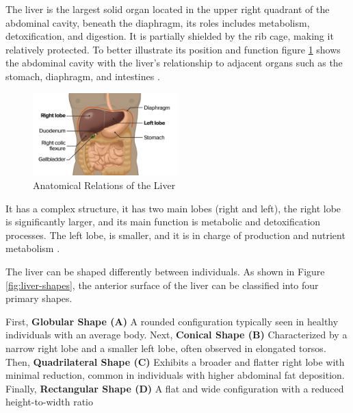 The liver is the largest solid organ located in the upper right quadrant of the abdominal cavity, beneath the diaphragm, its roles includes metabolism, detoxification, and digestion. It is partially shielded by the rib cage, making it relatively protected. To better illustrate its position and function figure \ref{fig:liver-relations} shows the abdominal cavity with the liver’s relationship to adjacent organs such as the stomach, diaphragm, and intestines \cite{lecturio2023,ozmen2020}. 

\begin{figure}[H] %
	\centering
	\includegraphics[width=0.5\textwidth]{assets/Liver-relations.png} %
	\caption{Anatomical Relations of the Liver}
	\label{fig:liver-relations}
\end{figure}

It has a complex structure, it has two main lobes (right and left), the right lobe is significantly larger, and its main function is metabolic and detoxification processes. The left lobe, is smaller, and it is in charge of production and nutrient metabolism \cite{ozmen2020}.

The liver can be shaped differently between individuals. As shown in Figure \ref{fig:liver-shapes}, the anterior surface of the liver can be classified into four primary shapes.

First, \textbf{Globular Shape (A)} A rounded configuration typically seen in healthy individuals with an average body. Next, \textbf{Conical Shape (B)} Characterized by a narrow right lobe and a smaller left lobe, often observed in elongated torsos. Then, \textbf{Quadrilateral Shape (C)} Exhibits a broader and flatter right lobe with minimal reduction, common in individuals with higher abdominal fat deposition. Finally, \textbf{Rectangular Shape (D)} A flat and wide configuration with a reduced height-to-width ratio \cite{ozmen2020}%


